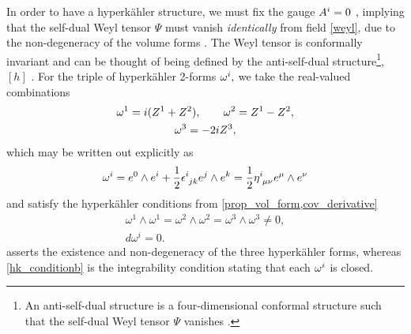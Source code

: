 \documentclass[a4paper,12pt, onecolumn, notitlepage]{article}
\theoremstyle{definition}
\theoremstyle{remark}
\newcommand{\w}{\omega}
\newcommand{\m}{\mu}
\newcommand{\n}{\nu}
\newcommand{\e}{\epsilon}
\newcommand{\HK}{hyperk\"ahler }
\newcommand{\hooft}[3]{\eta\indices{^{#1}_{#2}_{#3}}}
\begin{document}
In order to have a \HK structure, we must fix the gauge $A\indices{^i}=0$ \cite{capovilla_1991}, implying that the self-dual Weyl tensor $\Psi$ must vanish \emph{identically} from field \cref{weyl}, due to the non-degeneracy of the volume forms \cite{capovilla_1993}. The Weyl tensor is conformally invariant and can be thought of being defined by the anti-self-dual structure\footnote{An anti-self-dual structure is a four-dimensional conformal structure such that the self-dual Weyl tensor $\Psi$ vanishes \cite{solitons}.}, $[h]$ \cite{solitons}.
For the triple of \HK 2-forms $\w\indices{^i},$ we take the real-valued combinations
\begin{gather*}
\w\indices{^1} = i(Z^{1}+Z^{2}),\qquad \w\indices{^2}= Z^{1}-Z^{2},\\\w\indices{^3} = -2iZ\indices{^3},
\end{gather*}
which may be written out explicitly as
\begin{equation}
	\label{sd_form}
	\w^{i} = e^{0}\wedge e^{i} + \frac{1}{2}\e\indices{^i_j_k}e^{j}\wedge e^{k} = \frac{1}{2}\hooft{i}{\m}{\n}e^{\m}\wedge e^{\n}
\end{equation}
and satisfy the \HK conditions from  \cref{prop_vol_form,cov_derivative} 
\begin{subequations}
	\begin{gather}
	\label{hk_conditiona}
	\w^{1}\wedge\w^{1} = \w^{2}\wedge\w^{2} =\w^{3}\wedge\w^{3} \neq 0,\\
	\label{hk_conditionb}
	d\w^{i} = 0. 
	\end{gather}
\end{subequations}
 asserts the existence and non-degeneracy of the three \HK forms, whereas \cref{hk_conditionb} is the integrability condition stating that each $\w\indices{^i}$ is closed.\\
\end{document}
